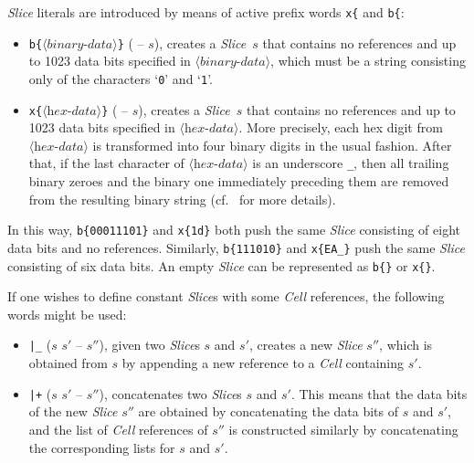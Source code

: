 \documentclass[12pt,oneside]{article}
\begin{document}
{\em Slice\/} literals are introduced by means of active prefix words {\tt x\{} and {\tt b\{}:
\begin{itemize}
\item {\tt b\{$\langle\textit{binary-data}\rangle$\}} ( -- $s$), creates a {\em Slice}~$s$ that contains no references and up to 1023 data bits specified in $\langle\textit{binary-data}\rangle$, which must be a string consisting only of the characters `{\tt 0}' and `{\tt 1}'.
\item {\tt x\{$\langle\textit{hex-data}\rangle$\}} ( -- $s$), creates a {\em Slice}~$s$ that contains no references and up to 1023 data bits specified in $\langle\textit{hex-data}\rangle$. More precisely, each hex digit from $\langle\textit{hex-data}\rangle$ is transformed into four binary digits in the usual fashion. After that, if the last character of $\langle\textit{hex-data}\rangle$ is an underscore {\tt \_}, then all trailing binary zeroes and the binary one immediately preceding them are removed from the resulting binary string (cf.~\cite[1.0]{TVM} for more details).
\end{itemize}
In this way, {\tt b\{00011101\}} and {\tt x\{1d\}} both push the same {\em Slice} consisting of eight data bits and no references. Similarly, {\tt b\{111010\}} and {\tt x\{EA\_\}} push the same {\em Slice\/} consisting of six data bits. An empty {\em Slice} can be represented as {\tt b\{\}} or {\tt x\{\}}.

If one wishes to define constant {\em Slice}\/s with some {\em Cell\/} references, the following words might be used:
\begin{itemize}
\item {\tt |\_} ($s$ $s'$ -- $s''$), given two {\em Slice}\/s $s$ and $s'$, creates a new {\em Slice} $s''$, which is obtained from $s$ by appending a new reference to a {\em Cell\/} containing $s'$.
\item {\tt |+} ($s$ $s'$ -- $s''$), concatenates two {\em Slice}\/s $s$ and $s'$. This means that the data bits of the new {\em Slice} $s''$ are obtained by concatenating the data bits of $s$ and $s'$, and the list of {\em Cell\/} references of $s''$ is constructed similarly by concatenating the corresponding lists for $s$ and $s'$.
\end{itemize}
\end{document}
